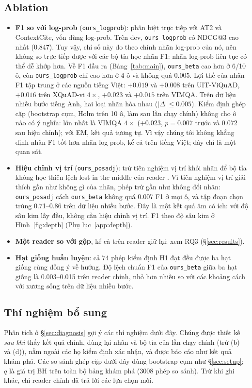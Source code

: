 \documentclass[11pt]{article}
\newcommand{\arm}[1]{\texttt{#1}}
\begin{document}
\subsection{Ablation}
\begin{itemize}
  \item \textbf{F1 so với log-prob} (\arm{ours\_logprob}): phân biệt trực tiếp với AT2
  và ContextCite, vốn dùng log-prob. Trên dev, \arm{ours\_logprob} có NDCG@3 cao nhất (0.847). Tuy vậy,
  chỉ số này đo theo chính nhãn log-prob của nó, nên không so trực tiếp được với các bộ tỉa học nhãn F1:
  nhãn log-prob liên tục có thể dễ khớp hơn. Về F1 đầu ra (Bảng~\ref{tab:main}), \arm{ours\_beta} cao hơn ở
  6/10 ô, còn \arm{ours\_logprob} chỉ cao hơn ở 4 ô và không quá 0.005. Lợi thế của nhãn F1 tập trung ở các
  nguồn tiếng Việt: $+0.019$ và $+0.008$ trên UIT-ViQuAD, $+0.016$ trên XQuAD-vi $4\times$, $+0.023$ và
  $+0.015$ trên VIMQA. Trên dữ liệu nhiều bước tiếng Anh, hai loại nhãn hòa nhau ($|\Delta|\le0.005$). Kiểm định
  ghép cặp (bootstrap cụm, Holm trên 10 ô, làm sau lần chạy chính) không cho ô nào có ý nghĩa: lớn nhất là VIMQA $4\times$
  ($+0.023$, $p=0.007$ trước và $0.072$ sau hiệu chỉnh); với EM, kết quả tương tự. Vì vậy chúng tôi không khẳng định nhãn F1
  tốt hơn nhãn log-prob, kể cả trên tiếng Việt; đây chỉ là một quan sát.
  \item \textbf{Hiệu chỉnh vị trí} (\arm{ours\_posadj}): trừ tiên nghiệm vị trí khỏi nhãn để bộ tỉa không học
  thiên lệch lost-in-the-middle của reader \citep{liu2024lost}. Vì tiên nghiệm vị trí giải thích gần như không
  gì của nhãn, phép trừ gần như không đổi nhãn: \arm{ours\_posadj} cách \arm{ours\_beta} không quá 0.007 F1 ở mọi
  ô, và tập đoạn chọn trùng 0.71--0.86 trên dữ liệu nhiều bước. Đây là một kết quả âm có ích: với độ sâu kim lấy
  đều, không cần hiệu chỉnh vị trí. F1 theo độ sâu kim ở Hình~\ref{fig:depth} (Phụ lục~\ref{app:depth}).
  \item \textbf{Một reader so với gộp}, kể cả trên reader giữ lại: xem RQ3 (\S\ref{sec:results}).
  \item \textbf{Hạt giống huấn luyện}: cả 74 phép kiểm định H1 đạt đều được ba hạt giống cùng đồng ý về hướng.
  Độ lệch chuẩn F1 của \arm{ours\_beta} giữa ba hạt giống là 0.003--0.015 trên reader chính, nhỏ hơn nhiều so với
  các khoảng cách với xương sống trên dữ liệu nhiều bước.
\end{itemize}

\subsection{Thí nghiệm bổ sung}
\label{sec:followup}
Phân tích ở \S\ref{sec:diagnosis} gợi ý các thí nghiệm dưới đây. Chúng được thiết kế \emph{sau khi} thấy kết quả
chính, dùng lại nhãn và bộ tỉa của lần chạy chính (trừ (b) và (d)), nằm ngoài các họ kiểm định xác nhận, và được
báo cáo như kết quả khám phá. Các so sánh ghép cặp dưới đây dùng bootstrap cụm như \S\ref{sec:setup}; $q$ là giá trị
BH trên toàn bộ bảng khám phá (3008 phép so sánh). Trừ khi ghi khác, chỉ reader chính đã trả lời các lựa chọn mới.
\end{document}
